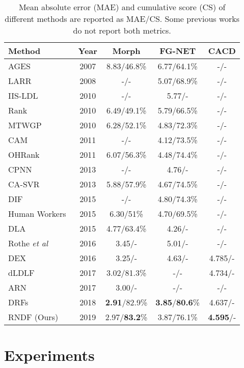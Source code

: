 \documentclass{bmvc2k}
\def\etal{\emph{et al}\bmvaOneDot}
\begin{document}
\begin{table}
	\begin{center}
		\begin{tabular}{|l|c|c|c|c|}
			\hline
			Method & Year& Morph & FG-NET & CACD\\
			\hline\hline
			AGES~\cite{Method:Ages} &2007&8.83/46.8\%&6.77/64.1\%&-/-\\
			LARR~\cite{LARR} &2008&-/- & 5.07/68.9\% & -/- \\
			IIS-LDL~\cite{LDL} &2010&-/-&5.77/-&-/-\\
			Rank~\cite{Method:rank} &2010&6.49/49.1\%&5.79/66.5\%&-/-\\
			MTWGP~\cite{MTWGP}  &2010&6.28/52.1\%&4.83/72.3\%&-/-\\
			CAM~\cite{CAM} &2011&-/- & 4.12/73.5\% & -/- \\
			OHRank~\cite{OHRank}  &2011&6.07/56.3\%&4.48/74.4\%&-/-\\
			CPNN~\cite{LDL} &2013&-/-&4.76/-&-/-\\
			CA-SVR~\cite{CASVR}  &2013&5.88/57.9\%&4.67/74.5\%&-/-\\
			DIF~\cite{HumanPerform} &2015&-/-&4.80/74.3\%&-/-\\
			Human Workers~\cite{HumanPerform} &2015&6.30/51\%&4.70/69.5\%&-/-\\
			DLA~\cite{DLA} &2015&4.77/63.4\%&4.26/-&-/-\\
			Rothe \etal~\cite{Rothe_2016_CVPR} &2016&3.45/-&5.01/-&-/-\\
			DEX~\cite{DEX} &2016&3.25/-&4.63/-&4.785/-\\
			dLDLF~\cite{dLDLF} &2017&3.02/81.3\% & -/- & 4.734/- \\
			ARN~\cite{ARN} &2017&3.00/- & -/- & -/- \\
			DRFs~\cite{DRFs} &2018&\textbf{2.91}/82.9\% & \textbf{3.85}/\textbf{80.6}\% & 4.637/-  \\
			RNDF (Ours) &2019&2.97/\textbf{83.2}\% & 3.87/76.1\% & \textbf{4.595}/- \\
			\hline
		\end{tabular}
	\end{center}
	\caption{Mean absolute error (MAE) and cumulative score (CS) of different methods are reported as MAE/CS. Some previous works do not report both metrics.}
	\label{comparison}
\end{table}

\section{Experiments}
\end{document}
